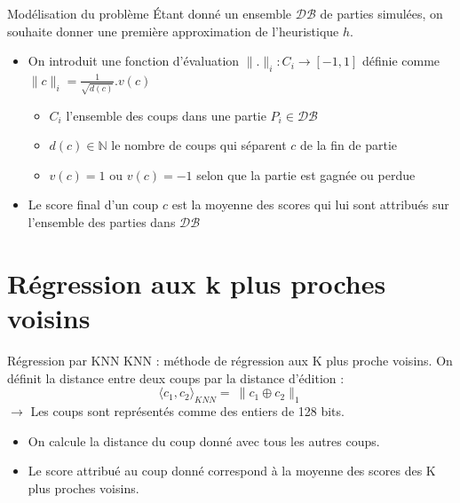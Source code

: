 \documentclass{beamer}
\begin{document}
\begin{frame}{Modélisation du problème}
    Étant donné un ensemble $\mathcal{DB}$ de parties simulées,
    on souhaite donner une première approximation de l'heuristique $h$.
    \begin{itemize}
        \item On introduit une fonction d'évaluation $\lVert.\rVert_i : C_i \to [-1, 1]$
              définie comme $\lVert c \rVert_i = \frac{1}{\sqrt{d(c)}}.v(c)$
              \begin{itemize}
                  \item $C_i$ l'ensemble des coups dans une partie $P_i \in \mathcal{DB}$
                  \item $d(c) \in \mathbb{N}$ le nombre de coups qui séparent $c$ de la fin de partie
                  \item $v(c) = 1$ ou $v(c) = -1$ selon que la partie est gagnée ou perdue
              \end{itemize}
        \item Le score final d'un coup $c$ est la moyenne des scores qui lui sont attribués sur l'ensemble des parties dans $\mathcal{DB}$
    \end{itemize}
\end{frame}

{\section{Régression aux k plus proches voisins}}

\begin{frame}{Régression par KNN}
    KNN : méthode de régression aux \alert{K plus proche voisins}.
    On définit la distance entre deux coups par la \alert{distance d'édition} :
    $$ \langle c_1, c_2 \rangle_{KNN} = \ \rVert c_1 \oplus c_2 \lVert_1 $$
    $\rightarrow$ Les coups sont représentés comme des entiers de 128 bits.
    \begin{itemize}
        \item On calcule la distance du coup donné avec tous les autres coups.
        \item Le score attribué au coup donné correspond à \alert{la moyenne des scores} des K plus proches voisins.
    \end{itemize}
\end{frame}
\end{document}
